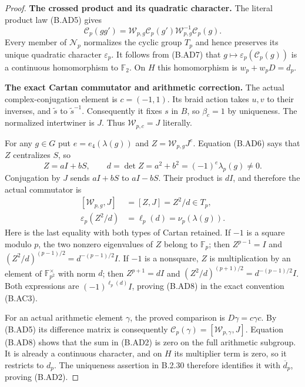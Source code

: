 \begin{proof}
\par\medskip\noindent\textbf{The crossed product and its quadratic character.}\quad
The literal product law (B.AD5) gives
\[
 \mathscr C_p(gg')
 =\mathcal W_{p,g}\mathscr C_p(g')
                      \mathcal W_{p,g}^{-1}\mathscr C_p(g).
                                                               \tag{B.AD7}
\]
Every member of $\mathscr N_p$ normalizes the cyclic
group $T_p$ and hence preserves its unique quadratic
character $\varepsilon_p$.
It follows from (B.AD7) that
$g\mapsto\varepsilon_p(\mathscr C_p(g))$ is a
continuous homomorphism to $\mathbb F_2$.
On $H$ this homomorphism is $w_p+w_pD=d_p$.

\par\medskip\noindent\textbf{The exact Cartan commutator and arithmetic correction.}\quad
The actual complex-conjugation element is
$c=(-1,1)$.  Its braid action takes $u,v$ to their
inverses, and $\widetilde s$ to $\widetilde s^{-1}$.
Consequently it fixes $s$ in $B$, so $\beta_c=1$
by uniqueness.  The normalized intertwiner is $J$.
Thus $\mathcal W_{p,c}=J$ literally.

For any $g\in G$ put $e=e_4(\lambda(g))$ and
$Z=\mathcal W_{p,g}J^e$.
Equation (B.AD6) says that $Z$ centralizes $S$, so
\[
 Z=aI+bS,\qquad d=\det Z=a^2+b^2
                        =(-1)^e\lambda_p(g)\ne0.
\]
Conjugation by $J$ sends $aI+bS$ to $aI-bS$.
Their product is $dI$, and therefore the actual
commutator is
\[
 \begin{aligned}
 [\mathcal W_{p,g},J]&=[Z,J]=Z^2/d\in T_p,\\
 \varepsilon_p(Z^2/d)&=\ell_p(d)=\nu_p(\lambda(g)).
 \end{aligned}
                                                               \tag{B.AD8}
\]
Here is the last equality with both types of Cartan
retained.  If $-1$ is a square modulo $p$, the two
nonzero eigenvalues of $Z$ belong to $\mathbb F_p$;
then $Z^{p-1}=I$ and
$(Z^2/d)^{(p-1)/2}=d^{-(p-1)/2}I$.
If $-1$ is a nonsquare, $Z$ is multiplication by
an element of $\mathbb F_{p^2}^{\times}$ with norm $d$;
then $Z^{p+1}=dI$ and
$(Z^2/d)^{(p+1)/2}=d^{-(p-1)/2}I$.
Both expressions are $(-1)^{\ell_p(d)}I$, proving
(B.AD8) in the exact convention (B.AC3).

For an actual arithmetic element $\gamma$, the proved
comparison is $D\gamma=c\gamma c$.
By (B.AD5) its difference matrix is consequently
$\mathscr C_p(\gamma)=[\mathcal W_{p,\gamma},J]$.
Equation (B.AD8) shows that the sum in (B.AD2) is zero
on the full arithmetic subgroup.
It is already a continuous character, and on $H$
its multiplier term is zero, so it restricts to $d_p$.
The uniqueness assertion in B.2.30 therefore identifies
it with $\overline d_p$, proving (B.AD2).


\end{proof}
